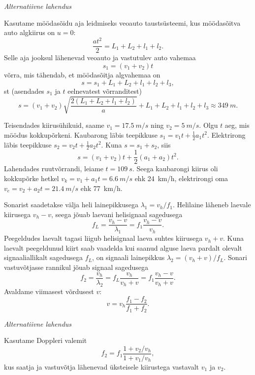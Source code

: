\documentclass[10pt]{article}
\begin{document}
{\emph{Alternatiivne lahendus}

Kasutame möödasõidu aja leidmiseks veoauto taustsüsteemi, kus möödasõitva auto
algkiirus on $u = 0$:
\[
\frac{at^2}{2} = L_1 + L_2 + l_1 + l_2.
\]
Selle aja jooksul lähenevad veoauto ja vastutulev auto vahemaa
\[
s_1 = (v_1 + v_2)t 
\]
võrra, mis tähendab, et möödasõitja algvahemaa on
\[
s = s_1 + L_1 + L_2 + l_1 + l_2 + l_3 ,
\]
st (asendades $s_1$ ja $t$ eelnevatest võrranditest)
\[
s=\left(v_{1}+v_{2}\right) \sqrt{\frac{2\left(L_{1}+L_{2}+l_{1}+l_{2}\right)}{a}}+L_{1}+L_{2}+l_{1}+l_{2}+l_{3} \approx \SI{349}{m}.
\]
\probend
\bigskip


\solu
Teisendades kiirusühikuid, saame $v_1 = \SI{17,5}{m/s}$ ning $v_2 = \SI{5}{m/s}$. Olgu $t$ aeg, mis möödus kokkupõrkeni. Kaubarong läbis teepikkuse $s_1 = v_1t + \frac{1}{2}a_1t^2$. Elektrirong läbis teepikkuse $s_2 = v_2t + \frac{1}{2}a_2t^2$. Kuna $s = s_1 + s_2$, siis
\[
s=\left(v_{1}+v_{2}\right) t+\frac{1}{2}\left(a_{1}+a_{2}\right) t^{2}.
\]
Lahendades ruutvõrrandi, leiame $t = \SI{109}{s}$. Seega kaubarongi kiirus oli kokkupõrke hetkel $v_k = v_1 + a_1t = \SI{6,6}{m/s}$ ehk \SI{24}{km/h}, elektrirongi oma $v_e = v_2 + a_2t = \SI{21,4}{m/s}$ ehk \SI{77}{km/h}.
\probend
\bigskip


\solu
Sonarist saadetakse välja heli lainepikkusega $\lambda_1 = v_h/f_1$. Helilaine läheneb laevale kiirusega $v_h - v$, seega jõuab laevani helisignaal sagedusega
\[
f_L = \frac{v_h-v}{\lambda_1} = f_1 \frac{v_h-v}{v_h}.
\]
Peegeldudes laevalt tagasi liigub helisignaal laeva suhtes kiirusega $v_h + v$. Kuna laevalt peegeldunud kiirt saab vaadelda kui saanud alguse laeva pardalt olevalt signaaliallikalt sagedusega $f_L$, on signaali lainepikkus $\lambda_2 = (v_h+v)/f_L$. Sonari vastuvõtjasse rannikul jõuab signaal sagedusega
\[
f_{2}=\frac{v_{h}}{\lambda_{2}}=f_{L} \frac{v_{h}}{v_{h}+v}=f_{1} \frac{v_{h}-v}{v_{h}+v}.
\]
Avaldame viimasest võrdusest $v$:
\[
v = v_h \frac{f_1-f_2}{f_1+f_2}.
\]

\vspace{0.5\baselineskip}

\emph{Alternatiivne lahendus}

Kasutame Doppleri valemit
\[
f_2 = f_1 \frac{1+v_2/v_h}{1+v_1/v_h},
\]
kus saatja ja vastuvõtja lähenevad üksteisele kiirustega vastavalt $v_1$ ja $v_2$.

}
\end{document}
